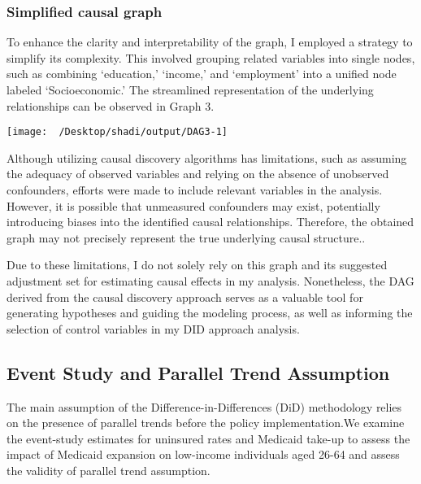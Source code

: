 \documentclass[
]{article}
\begin{document}
\hypertarget{simplified-causal-graph}{%
\subsubsection{Simplified causal graph}\label{simplified-causal-graph}}

To enhance the clarity and interpretability of the graph, I employed a
strategy to simplify its complexity. This involved grouping related
variables into single nodes, such as combining `education,' `income,'
and `employment' into a unified node labeled `Socioeconomic.' The
streamlined representation of the underlying relationships can be
observed in Graph 3.

\begin{center}\texttt{[image: ~/Desktop/shadi/output/DAG3-1]} \end{center}

Although utilizing causal discovery algorithms has limitations, such as
assuming the adequacy of observed variables and relying on the absence
of unobserved confounders, efforts were made to include relevant
variables in the analysis. However, it is possible that unmeasured
confounders may exist, potentially introducing biases into the
identified causal relationships. Therefore, the obtained graph may not
precisely represent the true underlying causal structure..

Due to these limitations, I do not solely rely on this graph and its
suggested adjustment set for estimating causal effects in my analysis.
Nonetheless, the DAG derived from the causal discovery approach serves
as a valuable tool for generating hypotheses and guiding the modeling
process, as well as informing the selection of control variables in my
DID approach analysis.

\hypertarget{event-study-and-parallel-trend-assumption}{%
\subsection{Event Study and Parallel Trend
Assumption}\label{event-study-and-parallel-trend-assumption}}

The main assumption of the Difference-in-Differences (DiD) methodology
relies on the presence of parallel trends before the policy
implementation.We examine the event-study estimates for uninsured rates
and Medicaid take-up to assess the impact of Medicaid expansion on
low-income individuals aged 26-64 and assess the validity of parallel
trend assumption.
\end{document}
